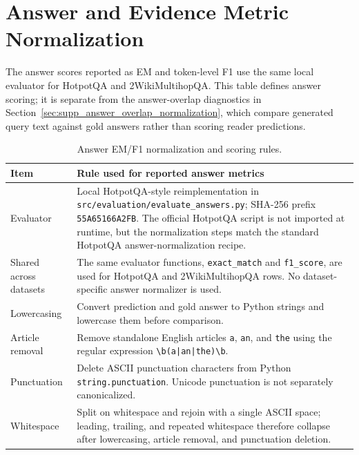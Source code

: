 \documentclass[10pt]{article}
\begin{document}


\clearpage
\section{Answer and Evidence Metric Normalization}
\label{sec:supp_metric_normalization}

The answer scores reported as EM and token-level F1 use the same local evaluator for HotpotQA and 2WikiMultihopQA. This table defines answer scoring; it is separate from the answer-overlap diagnostics in Section~\ref{sec:supp_answer_overlap_normalization}, which compare generated query text against gold answers rather than scoring reader predictions.

\begin{table}[t]
\centering
\caption{Answer EM/F1 normalization and scoring rules.}
\label{tab:answer_metric_definition}
\scriptsize
\begin{threeparttable}
\setlength{\tabcolsep}{4pt}
\begin{tabularx}{\textwidth}{>{\raggedright\arraybackslash}p{}
                            >{\raggedright\arraybackslash}X}
\toprule
Item & Rule used for reported answer metrics \\
\midrule
Evaluator & Local HotpotQA-style reimplementation in \texttt{src/evaluation/evaluate\_answers.py}; SHA-256 prefix \texttt{55A65166A2FB}. The official HotpotQA script is not imported at runtime, but the normalization steps match the standard HotpotQA answer-normalization recipe. \\
Shared across datasets & The same evaluator functions, \texttt{exact\_match} and \texttt{f1\_score}, are used for HotpotQA and 2WikiMultihopQA rows. No dataset-specific answer normalizer is used. \\
Lowercasing & Convert prediction and gold answer to Python strings and lowercase them before comparison. \\
Article removal & Remove standalone English articles \texttt{a}, \texttt{an}, and \texttt{the} using the regular expression \texttt{\textbackslash b(a|an|the)\textbackslash b}. \\
Punctuation & Delete ASCII punctuation characters from Python \texttt{string.punctuation}. Unicode punctuation is not separately canonicalized. \\
Whitespace & Split on whitespace and rejoin with a single ASCII space; leading, trailing, and repeated whitespace therefore collapse after lowercasing, article removal, and punctuation deletion. \\

\end{tabularx}
\end{threeparttable}
\end{table}
\end{document}
